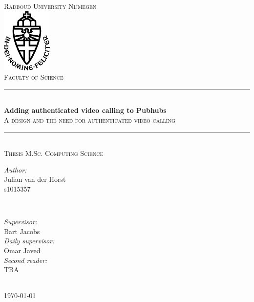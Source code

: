 \documentclass{report}
\title{\thesistitle}
\author{\thesisauthorfirst\space\thesisauthorsecond}
\date{\thesisdate}
\newcommand{\thesistitle}{Adding authenticated video calling to Pubhubs}
\newcommand{\thesissubtitle}{A design and the need for authenticated video calling}
\newcommand\thesisauthorfirst{Julian van der Horst \\ s1015357}
\newcommand\thesisauthorsecond{}
\newcommand\thesissupervisorfirst{Bart Jacobs}
\newcommand\thesissupervisorsecond{Omar Javed}
\newcommand\thesissecondreaderfirst{TBA}
\newcommand\thesissecondreadersecond{}
\newcommand\thesisdate{May 2023}
\begin{document}
\begin{titlepage}
\thispagestyle{empty}
\newcommand{\HRule}{\rule{\linewidth}{0.5mm}}
\center
\textsc{\Large Radboud University Nijmegen}\\[.7cm]
\includegraphics[width=25mm]{img/in_dei_nomine_feliciter}\\[.5cm]
\textsc{Faculty of Science}\\[0.5cm]

\HRule \\[0.4cm]
{ \huge \bfseries \thesistitle}\\[0.1cm]
\textsc{\thesissubtitle}\\
\HRule \\[.5cm]
\textsc{\large Thesis M.Sc. Computing Science}\\[.5cm]

\begin{minipage}{0.4\textwidth}
    \begin{flushleft}
        \large
        \emph{Author:}\\
        \thesisauthorfirst\space \textsc{\thesisauthorsecond}
    \end{flushleft}
\end{minipage}
~
\begin{minipage}{0.4\textwidth}
    \begin{flushright}
        \large
        \emph{Supervisor:} \\
        \thesissupervisorfirst  \\[1em]
        \emph{Daily supervisor:} \\
        \thesissupervisorsecond \\[1em]
        \emph{Second reader:} \\
        \thesissecondreaderfirst\\
    \end{flushright}
\end{minipage}\\[4cm]
\vfill
{\large \today}\\
\clearpage
\end{titlepage}
\end{document}
